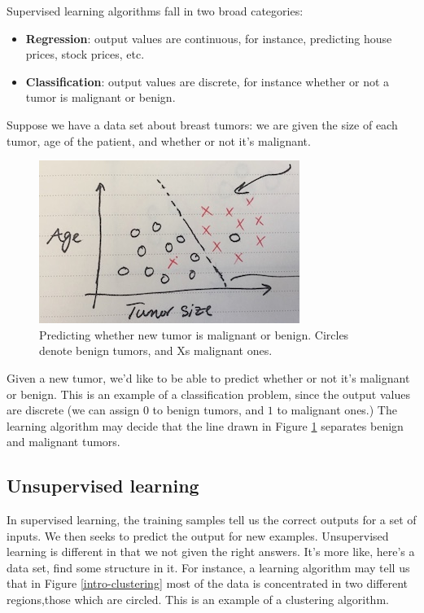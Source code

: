 \documentclass{article}
\theoremstyle{definition}
\begin{document}
Supervised learning algorithms fall in two broad categories:
\begin{itemize}
    \item \textbf{Regression}: output values are continuous, for instance, predicting house prices, stock prices, etc.
    \item \textbf{Classification}: output values are discrete, for instance whether or not a tumor is malignant or benign.
\end{itemize}

Suppose we have a data set about breast tumors: we are given the size of each tumor, age of the patient, and whether or not it's malignant.

\begin{figure}[ht]
\centering
\includegraphics[scale=0.8]{images/intro/tumor.jpg}
\caption{Predicting whether new tumor is malignant or benign. Circles denote benign tumors, and Xs malignant ones.}
\label{intro-tumor}
\end{figure}

Given a new tumor, we'd like to be able to predict whether or not it's malignant or benign. This is an example of a classification problem, since the output values are discrete (we can assign $0$ to benign tumors, and $1$ to malignant ones.) The learning algorithm may decide that the line drawn in Figure \ref{intro-tumor} separates benign and malignant tumors.

\subsection{Unsupervised learning}
In supervised learning, the training samples tell us the correct outputs for a set of inputs. We then seeks to predict the output for new examples. Unsupervised learning is different in that we not given the right answers. It's more like, here's a data set, find some structure in it. For instance, a learning algorithm may tell us that in Figure \ref{intro-clustering} most of the data is concentrated in two different regions,those which are circled. This is an example of a clustering algorithm.
\end{document}
